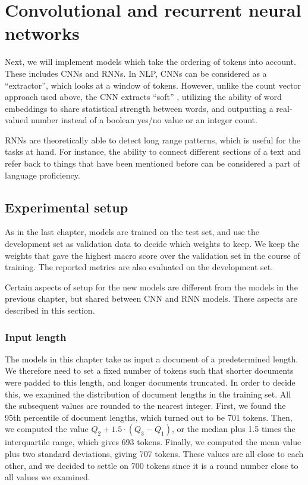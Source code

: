\chapter{Convolutional and recurrent neural networks}
\label{ch:sequencemodels}

Next, we will implement models which take the ordering of tokens into
account. These includes \acp{CNN} and \acp{RNN}. In \ac{NLP}, \acp{CNN} can
be considered as a ``\ngram extractor'', which looks at a window of tokens.
However, unlike the count vector approach used above, the CNN extracts
``soft'' \ngrams, utilizing the ability of word embeddings to share
statistical strength between words, and outputting a real-valued number
instead of a boolean yes/no value or an integer count.

\acp{RNN} are theoretically able to detect long range patterns, which is
useful for the tasks at hand. For instance, the ability to connect different
sections of a text and refer back to things that have been mentioned before
can be considered a part of language proficiency.


\section{Experimental setup}

As in the last chapter, models are trained on the test set, and use the
development set as validation data to decide which weights to keep. We keep
the weights that gave the highest macro \FI score over the validation set in
the course of training. The reported metrics are also evaluated on the
development set.

Certain aspects of setup for the new models are different from the models in
the previous chapter, but shared between \ac{CNN} and \ac{RNN} models. These
aspects are described in this section.


\subsection{Input length}

The models in this chapter take as input a document of a predetermined
length. We therefore need to set a fixed number of tokens such that shorter
documents were padded to this length, and longer documents truncated. In
order to decide this, we examined the distribution of document lengths in the
training set. All the subsequent values are rounded to the nearest integer.
First, we found the 95th percentile of document lengths, which turned out to
be 701 tokens. Then, we computed the value $Q_2 + 1.5 \cdot (Q_3 - Q_1)$, or
the median plus 1.5 times the interquartile range, which gives 693 tokens.
Finally, we computed the mean value plus two standard deviations, giving 707
tokens. These values are all close to each other, and we decided to settle on
700 tokens since it is a round number close to all values we examined.

